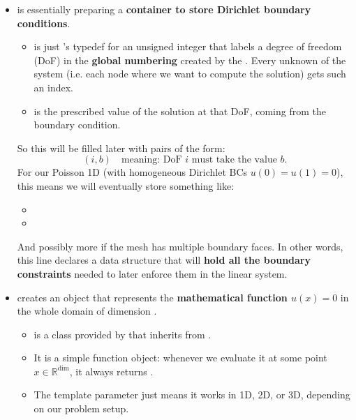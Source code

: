 \begin{itemize}
    \item {} is essentially preparing a \textbf{container to store Dirichlet boundary conditions}.
    \begin{itemize}
        \item {} is just 's typedef for an unsigned integer that labels a degree of freedom (DoF) in the \textbf{global numbering} created by the . Every unknown of the system (i.e. each node where we want to compute the solution) gets such an index.
        \item {} is the prescribed value of the solution at that DoF, coming from the boundary condition.
    \end{itemize}
    So this  will be filled later with pairs of the form:
    \begin{equation*}
        (i, b) \quad \text{meaning: DoF } i \text{ must take the value } b.
    \end{equation*}
    For our Poisson 1D (with homogeneous Dirichlet BCs $u(0)=u(1)=0$), this means we will eventually store something like:
    \begin{itemize}
        \item {}
        \item {}
    \end{itemize}
    And possibly more if the mesh has multiple boundary faces. In other words, this line declares a data structure that will \textbf{hold all the boundary constraints} needed to later enforce them in the linear system. 


    \item {} creates an object that represents the \textbf{mathematical function $u(x)=0$} in the whole domain of dimension .
    \begin{itemize}
        \item {} is a class provided by  that inherits from .
        \item It is a simple function object: whenever we evaluate it at some point $x \in \mathbb{R}^\text{dim}$, it always returns .
        \item The template parameter  just means it works in 1D, 2D, or 3D, depending on our problem setup.
    \end{itemize}


\end{itemize}
